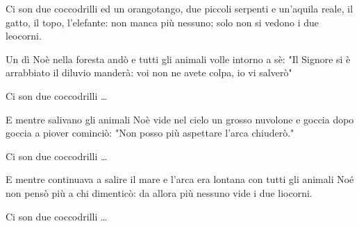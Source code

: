 
\beginchorus

Ci son due coccodrilli
ed un orangotango,
due piccoli serpenti
e un'aquila reale,
il gatto, il topo, l'elefante:
non manca più nessuno;
solo non si vedono i due leocorni.

\endchorus

\beginverse

Un dì Noè nella foresta andò
e tutti gli animali volle intorno a sè:
"Il Signore si è arrabbiato il diluvio manderà:
voi non ne avete colpa, io vi salverò"

\endverse

\chordsoff

\beginchorus

Ci son due coccodrilli \dots

\endchorus

\beginverse

E mentre salivano gli animali
Noè vide nel cielo un grosso nuvolone
e goccia dopo goccia a piover cominciò:
"Non posso più aspettare l'arca chiuderò."

\endverse

\beginchorus

Ci son due coccodrilli \dots

\endchorus

\beginverse

E mentre continuava a salire il mare
e l'arca era lontana con tutti gli animali
Noé non pensò più a chi dimenticò:
da allora più nessuno vide i due liocorni.

\endverse

\beginchorus

Ci son due coccodrilli \dots

\endchorus

\endsong